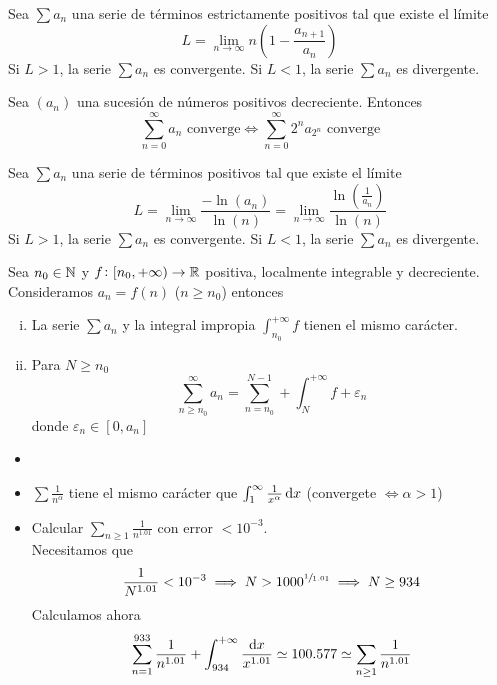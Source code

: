 \begin{prop}
	Sea $\sum a_n$ una serie de términos estrictamente positivos tal que existe el límite
	\[
		L = \lim_{n \to \infty} n\left( 1 - \frac{a_{n+1}}{a_n} \right)
	\]
	Si $L > 1$, la serie $\sum a_n$ es convergente. Si $L < 1$, la serie $\sum a_n$ es
	divergente.
\end{prop}

\begin{prop*}
	Sea $(a_n)$ una sucesión de números positivos decreciente. Entonces
	\[
		\sum_{n=0}^{\infty} a_n \text{ converge} \iff \sum_{n=0}^{\infty} 2^n a_{2^n}
		\text{ converge}
	\]
\end{prop*}

\begin{prop*}
	Sea $\sum a_n$ una serie de términos positivos tal que existe el límite
	\[
		L = \lim_{n \to \infty} \frac{- \ln(a_n)}{\ln(n)} = \lim_{n \to \infty}
		\frac{\ln\left( \frac{1}{a_n} \right)}{\ln(n)}
	\]
	Si $L > 1$, la serie $\sum a_n$ es convergente. Si $L < 1$, la serie $\sum a_n$ es
	divergente.
\end{prop*}

\begin{prop}
	Sea $n_0 \in \mathbb{N}$ y $f \colon [n_0, +\infty) \to \mathbb{R}$ positiva, localmente integrable
	y decreciente. Consideramos $a_n = f(n)$ ($n \geq n_0$) entonces
	\begin{enumerate}[i)]
		\item La serie $\sum a_n$ y la integral impropia
		$\int_{n_0}^{+\infty} f$ tienen el mismo carácter.
		\item Para $N \geq n_0$
		\[
			\sum_{n \geq n_0}^{\infty} a_n = \sum_{n = n_0}^{N-1} + \int_{N}^{+\infty}f +
			\varepsilon_n
		\]
		donde $\varepsilon_n \in [0, a_n]$
	\end{enumerate}
\end{prop}

\begin{example*}
	\begin{itemize}
		\item[]
		\item $\sum \frac{1}{n^\alpha}$ tiene el mismo carácter que
			$\int_{1}^{\infty} \frac{1}{x^\alpha} \dif x$ (convergete $\iff \alpha > 1$)
		\item Calcular $\sum\limits_{n\geq 1} \frac{1}{n^{1.01}}$ con error $< 10^{-3}$. \\
			Necesitamos que
			\[
				\frac{1}{N^{1.01}} < 10^{-3} \implies N > 1000^{\sfrac{1}{1.01}} \implies
				N \geq 934
			\]
			Calculamos ahora
			\[
				\sum_{n=1}^{933} \frac{1}{n^{1.01}} + \int_{934}^{+\infty}
				\frac{\dif x}{x^{1.01}} \simeq 100.577 \simeq\sum_{n\geq 1}\frac{1}{n^{1.01}}
			\]
	\end{itemize}
\end{example*}

